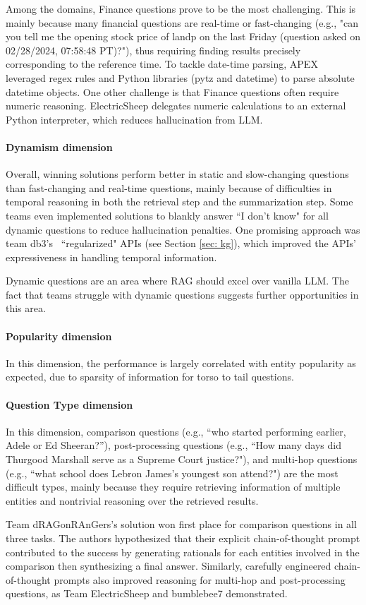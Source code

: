 Among the domains, Finance questions prove to be the most challenging. This is mainly because many financial questions are real-time or fast-changing (e.g., "can you tell me the opening stock price of landp on the last Friday (question asked on 02/28/2024, 07:58:48 PT)?"), thus requiring finding results precisely corresponding to the reference time. To tackle date-time parsing, APEX~\cite{apex} leveraged regex rules and Python libraries (pytz and datetime) to parse absolute datetime objects. One other challenge is that Finance questions often require numeric reasoning. ElectricSheep \cite{electricsheep} delegates numeric calculations to an external Python interpreter, which reduces hallucination from LLM. 

\paragraph{Dynamism dimension} Overall, winning solutions perform better in static and slow-changing questions than fast-changing and real-time questions, mainly because of difficulties in temporal reasoning in both the retrieval step and the summarization step. Some teams even implemented solutions to blankly answer ``I don't know" for all dynamic questions to reduce hallucination penalties. One promising approach was team db3's~\cite{db3} ``regularized" APIs (see Section \ref{sec: kg}), which improved the APIs' expressiveness in handling temporal information.

Dynamic questions are an area where RAG should excel over vanilla LLM. The fact that teams struggle with dynamic questions suggests further opportunities in this area.

\paragraph{Popularity dimension} In this dimension, the performance is largely correlated with entity popularity as expected, due to sparsity of information for torso to tail questions.

\paragraph{Question Type dimension} In this dimension, comparison questions (e.g., ``who started performing earlier, Adele or Ed Sheeran?”), post-processing questions (e.g., ``How many days did Thurgood Marshall serve as a Supreme
Court justice?"),  and multi-hop questions (e.g., ``what school does Lebron James's youngest son attend?") are the most difficult types, mainly because they require retrieving information of multiple entities and nontrivial reasoning over the retrieved results. 

Team dRAGonRAnGers's \cite{dragonrangers} solution won first place for comparison questions in all three tasks. The authors hypothesized that their explicit chain-of-thought prompt contributed to the success by generating rationals for each entities involved in the comparison then synthesizing a final answer. Similarly, carefully engineered chain-of-thought prompts also improved reasoning for multi-hop and post-processing questions, as Team ElectricSheep \cite{electricsheep} and bumblebee7 \cite{bumblebee7} demonstrated.

